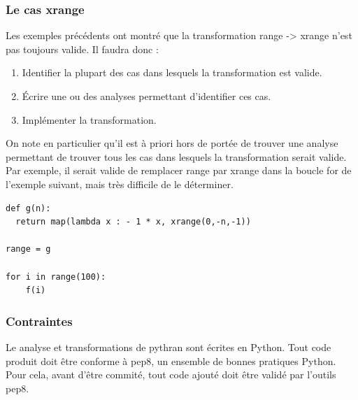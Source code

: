 \documentclass[a4paper]{article}
\begin{document}
\subsubsection{Le cas xrange}


Les exemples précédents ont montré que la transformation range ->
xrange n'est pas toujours valide. Il faudra donc :

\begin{enumerate}
\item Identifier la plupart des cas dans lesquels la transformation
  est valide.
\item Écrire une ou des analyses permettant d'identifier ces cas.
\item Implémenter la transformation.
\end{enumerate}

On note en particulier qu'il est à priori hors de portée de trouver
une analyse permettant de trouver tous les cas dans lesquels la
transformation serait valide. Par exemple, il serait valide de
remplacer range par xrange dans la boucle for de l'exemple suivant,
mais très difficile de le déterminer.


\begin{verbatim}
def g(n):
  return map(lambda x : - 1 * x, xrange(0,-n,-1))

range = g

for i in range(100):
    f(i)
\end{verbatim}

\subsubsection{Contraintes}

Le analyse et transformations de pythran sont écrites en Python. Tout
code produit doit être conforme à pep8, un ensemble de bonnes
pratiques Python. Pour cela, avant d'être commité, tout code ajouté
doit être validé par l'outils pep8.


\clearpage

\appendix


\listoffigures            



\end{document}
